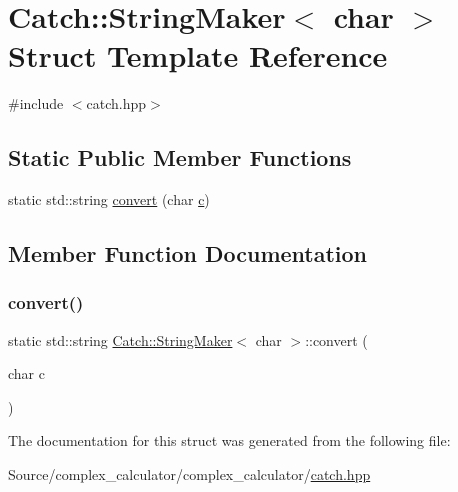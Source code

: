 \hypertarget{struct_catch_1_1_string_maker_3_01char_01_4}{}\section{Catch\+:\+:String\+Maker$<$ char $>$ Struct Template Reference}
\label{struct_catch_1_1_string_maker_3_01char_01_4}


{\ttfamily \#include $<$catch.\+hpp$>$}

\subsection*{Static Public Member Functions}
\begin{DoxyCompactItemize}
\item 
static std\+::string \mbox{\hyperlink{struct_catch_1_1_string_maker_3_01char_01_4_a4e3db69a12bb83f3ef89251893e65da5}{convert}} (char \mbox{\hyperlink{complex__calculator_8cpp_a05f328ec4e90bb80a9bd5808f6717512}{c}})
\end{DoxyCompactItemize}


\subsection{Member Function Documentation}
\mbox{\label{struct_catch_1_1_string_maker_3_01char_01_4_a4e3db69a12bb83f3ef89251893e65da5}} 
\subsubsection{\texorpdfstring{convert()}{convert()}}
{\footnotesize\ttfamily static std\+::string \mbox{\hyperlink{struct_catch_1_1_string_maker}{Catch\+::\+String\+Maker}}$<$ char $>$\+::convert (\begin{DoxyParamCaption}\item[{char}]{c }\end{DoxyParamCaption})\hspace{0.3cm}{\ttfamily [static]}}



The documentation for this struct was generated from the following file\+:\begin{DoxyCompactItemize}
\item 
Source/complex\+\_\+calculator/complex\+\_\+calculator/\mbox{\hyperlink{catch_8hpp}{catch.\+hpp}}\end{DoxyCompactItemize}
